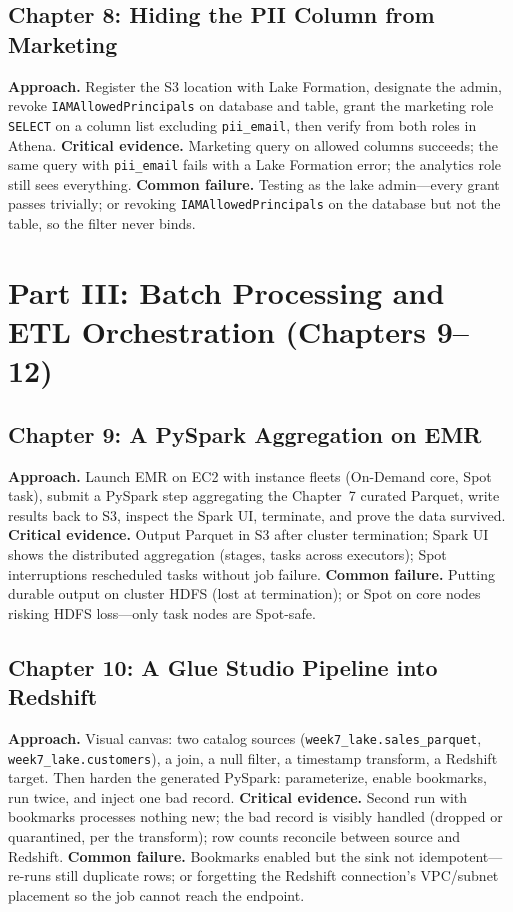 \subsection{Chapter 8: Hiding the PII Column from Marketing}
\textbf{Approach.} Register the S3 location with Lake Formation, designate the admin, revoke
\texttt{IAMAllowedPrincipals} on database and table, grant the marketing role \texttt{SELECT} on
a column list excluding \texttt{pii\_email}, then verify from both roles in Athena.
\textbf{Critical evidence.} Marketing query on allowed columns succeeds; the same query with
\texttt{pii\_email} fails with a Lake Formation error; the analytics role still sees everything.
\textbf{Common failure.} Testing as the lake admin---every grant passes trivially; or revoking
\texttt{IAMAllowedPrincipals} on the database but not the table, so the filter never binds.

\section{Part III: Batch Processing and ETL Orchestration (Chapters 9--12)}
\subsection{Chapter 9: A PySpark Aggregation on EMR}
\textbf{Approach.} Launch EMR on EC2 with instance fleets (On-Demand core, Spot task), submit a
PySpark step aggregating the Chapter~7 curated Parquet, write results back to S3, inspect the
Spark UI, terminate, and prove the data survived.
\textbf{Critical evidence.} Output Parquet in S3 after cluster termination; Spark UI shows the
distributed aggregation (stages, tasks across executors); Spot interruptions rescheduled tasks
without job failure.
\textbf{Common failure.} Putting durable output on cluster HDFS (lost at termination); or Spot on
core nodes risking HDFS loss---only task nodes are Spot-safe.

\subsection{Chapter 10: A Glue Studio Pipeline into Redshift}
\textbf{Approach.} Visual canvas: two catalog sources (\texttt{week7\_lake.sales\_parquet},
\texttt{week7\_lake.customers}), a join, a null filter, a timestamp transform, a Redshift target.
Then harden the generated PySpark: parameterize, enable bookmarks, run twice, and inject one bad
record.
\textbf{Critical evidence.} Second run with bookmarks processes nothing new; the bad record is
visibly handled (dropped or quarantined, per the transform); row counts reconcile between source
and Redshift.
\textbf{Common failure.} Bookmarks enabled but the sink not idempotent---re-runs still duplicate
rows; or forgetting the Redshift connection's VPC/subnet placement so the job cannot reach the
endpoint.

